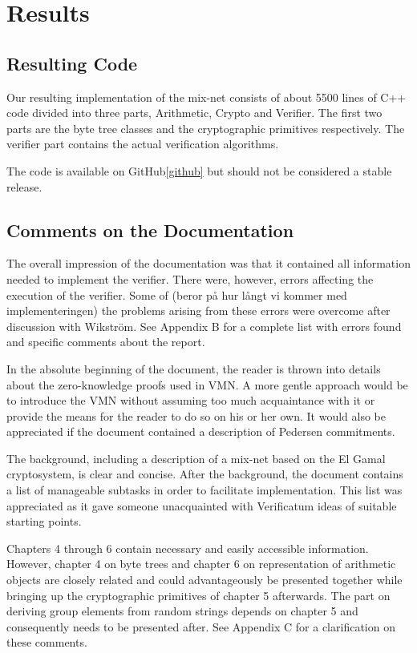 \section{Results}

\subsection{Resulting Code}

Our resulting implementation of the mix-net consists of about 5500 lines of C++ code divided into three parts, Arithmetic, Crypto and Verifier. The first two parts are the byte tree classes and the cryptographic primitives respectively. The verifier part contains the actual verification algorithms.

The code is available on GitHub\ref{github} but should not be considered a stable release.


\subsection{Comments on the Documentation}

The overall impression of the documentation was that it contained all
information needed to implement the verifier. There were, however,
errors affecting the execution of the verifier. Some of (beror på hur
långt vi kommer med implementeringen) the problems arising from these
errors were overcome after discussion with Wikström. See Appendix B
for a complete list with errors found and specific comments about the
report.

In the absolute beginning of the document, the reader is thrown into
details about the zero-knowledge proofs used in VMN. A more gentle
approach would be to introduce the VMN without assuming too much
acquaintance with it or provide the means for the reader to do so on
his or her own. It would also be appreciated if the document contained
a description of Pedersen commitments.

The background, including a description of a mix-net based on the El
Gamal cryptosystem, is clear and concise. After the background, the
document contains a list of manageable subtasks in order to facilitate
implementation. This list was appreciated as it gave someone
unacquainted with Verificatum ideas of suitable starting points.

Chapters 4 through 6 contain necessary and easily accessible
information. However, chapter 4 on byte trees and chapter 6 on
representation of arithmetic objects are closely related and could
advantageously be presented together while bringing up the
cryptographic primitives of chapter 5 afterwards. The part on deriving
group elements from random strings depends on chapter 5 and
consequently needs to be presented after. See Appendix C for a
clarification on these comments.

